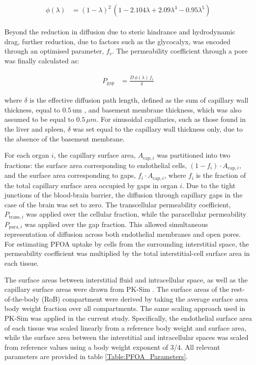 \documentclass[preprint,12pt,authoryear]{elsarticle}
\begin{document}
\begin{align}
\begin{aligned}
\phi(\lambda) &= (1 - \lambda)^{2} \, \left( 1 - 2.104 \lambda + 2.09 \lambda^{3} - 0.95 \lambda^{5} \right)
\end{aligned}
\end{align}

Beyond the reduction in diffusion due to steric hindrance and hydrodynamic drag, further reduction, due to factors such as the glycocalyx, was encoded through an optimised parameter, $f_r$. The permeability coefficient through a pore was finally calculated as:

\begin{align}
\begin{aligned}
P_{\text{gap}} &= \frac{D \, \phi(\lambda) \, f_r}{\delta} 
\end{aligned}
\end{align}

where $\delta$ is the effective diffusion path length, defined as the sum of capillary wall thickness, equal to $0.5 \, \text{um}$ \citep{ashoor_2019}, and basement membrane thickness, which was also assumed to be equal to $0.5 \, \mu m$. For sinusoidal capillaries, such as those found in the liver and spleen, $\delta$ was set equal to the capillary wall thickness only, due to the absence of the basement membrane. 

For each organ $i$, the capillary surface area, $A_{\text{cap},i}$ was partitioned into two fractions: the surface area corresponding to endothelial cells, $(1-f_{i}) \cdot A_{\text{cap},i}$, and the surface area corresponding to gaps, $f_{i} \cdot A_{\text{cap},i}$, where $f_{i}$ is the fraction of the total capillary surface area occupied by gaps in organ $i$. Due to the tight junctions of the blood-brain barrier, the diffusion through capillary gaps in the case of the brain was set to zero. The transcellular permeability coefficient, $P_{\text{trans},i}$ was applied over the cellular fraction, while the paracellular permeability $P_{\text{para},i}$ was applied over the gap fraction. This allowed simultaneous representation of diffusion across both endothelial membranes and open pores. For estimating PFOA uptake by cells from the surrounding interstitial space, the permeability coefficient was multiplied by the total interstitial-cell surface area in each tissue. 

The surface areas between interstitial fluid and intracellular space, as well as the capillary surface areas were drawn from PK-Sim \citep{willmann_2003, Niederalt_2018}. The surface areas of the rest-of-the-body (RoB) compartment were derived by taking the average surface area body weight fraction over all compartments. The same scaling approach used in PK-Sim was applied in the current study. Specifically, the endothelial surface area of each tissue was scaled linearly from a reference body weight and surface area, while the surface area between the interstitial and intracellular spaces was scaled from reference values using a body weight exponent of 3/4. All relevant parameters are provided in table \ref{Table:PFOA_Parameters}.
\end{document}
